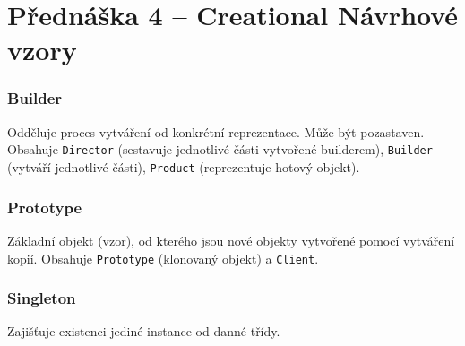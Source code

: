 \section{Přednáška 4 -- Creational Návrhové vzory}

\subsubsection{Builder}

Odděluje proces vytváření od konkrétní reprezentace.
Může být pozastaven.
Obsahuje \texttt{Director} (sestavuje jednotlivé části vytvořené builderem), \texttt{Builder} (vytváří jednotlivé části), \texttt{Product} (reprezentuje hotový objekt).

\subsubsection{Prototype}

Základní objekt (vzor), od kterého jsou nové objekty vytvořené pomocí vytváření kopií.
Obsahuje \texttt{Prototype} (klonovaný objekt) a \texttt{Client}.

\subsubsection{Singleton}

Zajišťuje existenci jediné instance od danné třídy.

